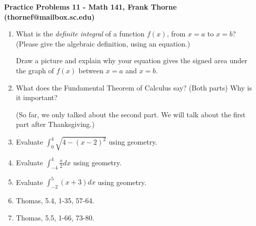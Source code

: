 \documentclass[12pt]{article}
\begin{document}
\setlength{\topmargin}{-2mm}





\begin{center}{\bf Practice Problems 11 - Math 141, Frank Thorne (thornef@mailbox.sc.edu)}

\medskip

\medskip

\end{center}
\vskip -0.1in

\begin{enumerate}

\item
What is the {\itshape definite integral} of a function $f(x)$, from $x = a$ to $x = b$? (Please give the algebraic definition, using an equation.)

Draw a picture and explain why your equation gives the signed area under the graph of $f(x)$ between $x = a$ and $x = b$.

\item
What does the Fundamental Theorem of Calculus say? (Both parts) Why is it important?

(So far, we only talked about the second part. We will talk about the first part after Thanksgiving.)

\item
Evaluate $\int_0^4 \sqrt{4 - (x - 2)^2}$ using geometry.

\item
Evaluate $\int_{-4}^4 \frac{x}{2} dx$ using geometry.

\item
Evaluate $\int_{-2}^5 (x + 3) dx$ using geometry.

\item
Thomas, 5.4, 1-35, 57-64.

\item
Thomas, 5.5, 1-66, 73-80.

\end{enumerate}
\end{document}
